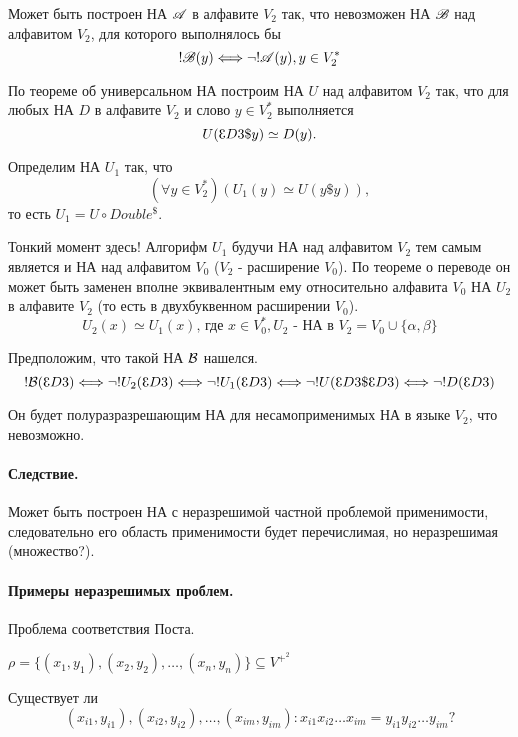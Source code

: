 \begin{theorem}
Может быть построен НА $\mathscr{A}$ в алфавите $V_2$ так, что невозможен НА $\mathscr{B}$ над
алфавитом $V_2$, для которого выполнялось бы $$!\mathscr{B}(y) \Longleftrightarrow
\lnot!\mathscr{A}(y), y \in V_2^{*}$$
\end{theorem}
\begin{myproof}
По теореме об универсальном НА построим НА $U$ над алфавитом  $V_2$ так, что для любых
НА $D$ в алфавите  $V_2$ и слово $y \in V_2^{*}$ выполняется
\[
    U(\zap{D}\$ y) \simeq D(y).
\]

Определим НА $U_1$ так, что
$$(\forall y \in V_2^{*})(U_1(y) \simeq U(y\$ y)),$$ то есть $U_1 = U \circ Double^{\$}$.

Тонкий момент здесь! Алгорифм $U_1$ будучи НА над алфавитом $V_2$ тем самым является и НА
над алфавитом $V_0$ ($V_2$ - расширение $V_0$). По теореме о переводе он может быть заменен
вполне эквивалентным ему относительно алфавита $V_0$
НА $U_2$ в алфавите $V_2$ (то есть в двухбуквенном расширении $V_0$).
\[
    U_2(x) \simeq U_1(x)\text{, где } x \in V_0^{*},
    U_2\text{ - НА в } V_2 = V_0 \cup \{\alpha,\beta\} 
\]

Предположим, что такой НА ${\cal B}$ нашелся.
\[
    !{\cal B}(\zap{D}) \Longleftrightarrow \lnot!U_2(\zap{D}) \Longleftrightarrow
    \lnot!U_1(\zap{D}) \Longleftrightarrow \lnot!U(\zap{D}\$\zap{D}) \Longleftrightarrow
    \lnot !D(\zap{D})
\] 

Он будет полуразразрешающим НА для несамоприменимых НА в языке $V_2$, что невозможно.
\end{myproof}

\paragraph*{Следствие.} Может быть построен НА с неразрешимой частной
проблемой применимости, следовательно его область применимости будет перечислимая, но
неразрешимая (множество?).


\paragraph*{Примеры неразрешимых проблем.} Проблема соответствия Поста.

$\rho = \{(x_1,y_1), (x_2,y_2), \ldots, (x_{n},y_{n})\} \subseteq V^{+^{2}}$

Существует ли $$(x_{i1}, y_{i1}), (x_{i 2}, y_{i 2}), \ldots, (x_{im}, y_{im}): 
x_{i 1}x_{i 2}\ldots x_{im} = y_{i1}y_{i 2}\ldots y_{im}?$$


